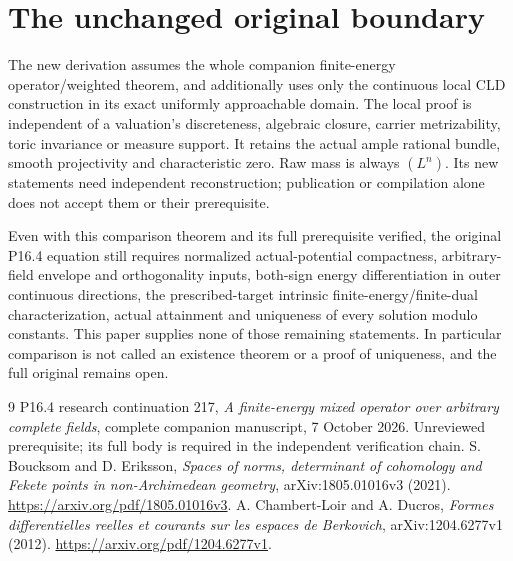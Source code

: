 \documentclass[11pt]{article}
\begin{document}
\section{The unchanged original boundary}

The new derivation assumes the whole companion finite-energy
operator/weighted theorem, and additionally uses only the continuous
local CLD construction in its exact uniformly approachable domain.
The local proof is independent of a valuation's discreteness,
algebraic closure, carrier metrizability, toric invariance or measure
support. It retains the actual ample rational bundle, smooth
projectivity and characteristic zero. Raw mass is always $(L^n)$.
Its new statements need independent reconstruction; publication or
compilation alone does not accept them or their prerequisite.

Even with this comparison theorem and its full prerequisite verified,
the original P16.4 equation still requires normalized actual-potential
compactness, arbitrary-field envelope and orthogonality inputs,
both-sign energy differentiation in outer continuous directions,
the prescribed-target intrinsic finite-energy/finite-dual
characterization, actual attainment and uniqueness of every solution
modulo constants. This paper supplies none of those remaining
statements. In particular comparison is not called an existence
theorem or a proof of uniqueness, and the full original remains open.

\begin{thebibliography}{9}
 P16.4 research continuation 217,
\emph{A finite-energy mixed operator over arbitrary complete fields},
complete companion manuscript, 7 October 2026. Unreviewed prerequisite;
its full body is required in the independent verification chain.
 S. Boucksom and D. Eriksson,
\emph{Spaces of norms, determinant of cohomology and Fekete points in
non-Archimedean geometry}, arXiv:1805.01016v3 (2021).
\url{https://arxiv.org/pdf/1805.01016v3}.
 A. Chambert-Loir and A. Ducros,
\emph{Formes differentielles reelles et courants sur les espaces de
Berkovich}, arXiv:1204.6277v1 (2012).
\url{https://arxiv.org/pdf/1204.6277v1}.
\end{thebibliography}
\end{document}
